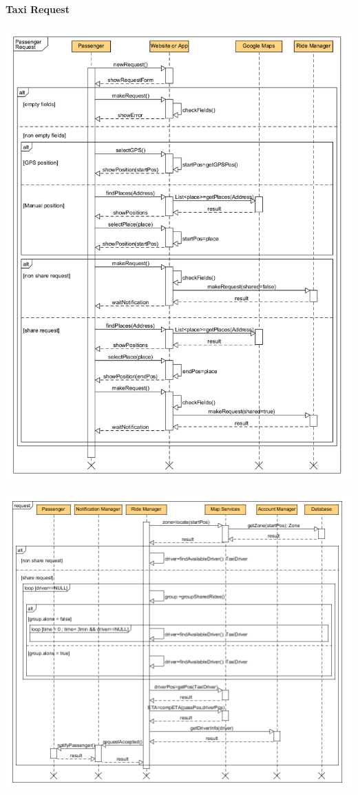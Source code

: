 \paragraph{Taxi Request}
	\begin{center}
		\includegraphics[width=\textwidth]{diagrams/passengerRequest.png}
	\end{center}
	
	\begin{center}
		\includegraphics[width=\textwidth]{diagrams/ServerRequest.png}
	\end{center}

